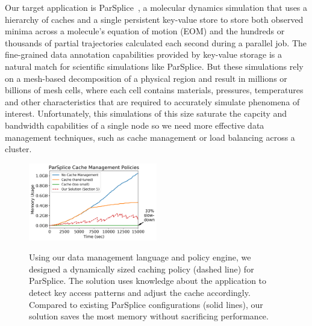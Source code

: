 
Our target application is ParSplice~\cite{perez:jctc20150parsplice}, a
molecular dynamics simulation that uses a hierarchy of caches and a single
persistent key-value store to store both observed minima across a molecule's
equation of motion (EOM) and the hundreds or thousands of partial trajectories
calculated each second during a parallel job.  The fine-grained data annotation
capabilities provided by key-value storage is a natural match for scientific
simulations like ParSplice. But these simulations rely on a mesh-based
decomposition of a physical region and result in millions or billions of mesh
cells, where each cell contains materials, pressures, temperatures and other
characteristics that are required to accurately simulate phenomena of interest.
Unfortunately, this simulations of this size saturate the capcity and bandwidth
capabilities of a single node so we need more effective data management
techniques, such as cache management or load balancing across a cluster.

\begin{figure}[t]
\noindent\includegraphics[width=0.5\textwidth]{figures/cache-management.png}\\
\caption{Using our data management language and policy engine, we designed a
dynamically sized caching policy (dashed line) for ParSplice. The solution uses
knowledge about the application to detect key access patterns and adjust the
cache accordingly. Compared to existing ParSplice configurations (solid lines),
our solution saves the most memory without sacrificing performance.
\label{fig:cache-management}}
\end{figure}

